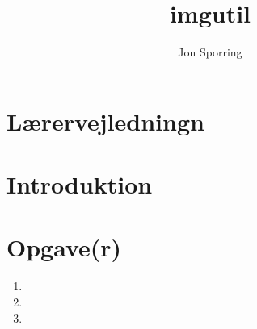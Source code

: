 \documentclass[a4paper,12pt]{article}
\title{imgutil}
\author{Jon Sporring}
\begin{document}
\maketitle

\section{Lærervejledningn}

\section{Introduktion}

\section{Opgave(r)}
\begin{enumerate}
\item 
\item 
\item 
\end{enumerate}
\end{document}
